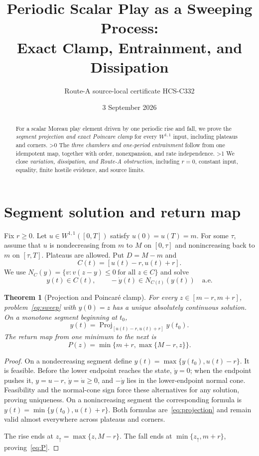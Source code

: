\documentclass[10pt]{article}
\title{Periodic Scalar Play as a Sweeping Process:\\Exact Clamp, Entrainment, and Dissipation}
\author{Route-A source-local certificate HCS-C332}
\date{3 September 2026}
\providecommand{\CRevisionRound}{2}
\newtheorem{theorem}{Theorem}
\newcommand{\Proj}{\operatorname{Proj}}
\begin{document}
\maketitle
\begin{abstract}
For a scalar Moreau play element driven by one periodic rise and fall, we
prove the \emph{segment projection and exact Poincare clamp} for every
$W^{1,1}$ input, including plateaus and corners.
\ifnum\CRevisionRound>0
The \emph{three chambers and one-period entrainment} follow from one
idempotent map, together with order, nonexpansion, and rate independence.
\fi
\ifnum\CRevisionRound>1
We close \emph{variation, dissipation, and Route-A obstruction}, including
$r=0$, constant input, equality, finite hostile evidence, and source limits.
\fi
\end{abstract}

\section{Segment solution and return map}
Fix $r\geq0$.  Let $u\in W^{1,1}([0,T])$ satisfy
$u(0)=u(T)=m$.  For some $\tau$, assume that $u$ is nondecreasing from
$m$ to $M$ on $[0,\tau]$ and nonincreasing back to $m$ on $[\tau,T]$.
Plateaus are allowed.  Put $D=M-m$ and
\[
 C(t)=[u(t)-r,u(t)+r].
\]
We use $N_C(y)=\{v:v(z-y)\leq0\ \text{for all }z\in C\}$ and solve
\begin{equation}\label{eq:sweep}
 y(t)\in C(t),\qquad-\dot y(t)\in N_{C(t)}(y(t))
 \quad\text{a.e.}
\end{equation}

\begin{theorem}[Projection and Poincar\'e clamp]\label{thm:clamp}
For every $z\in[m-r,m+r]$, problem~\eqref{eq:sweep} with $y(0)=z$ has a
unique absolutely continuous solution.  On a monotone segment beginning at
$t_0$,
\begin{equation}\label{eq:projection}
 y(t)=\Proj_{[u(t)-r,u(t)+r]}y(t_0).
\end{equation}
The return map from one minimum to the next is
\begin{equation}\label{eq:P}
 P(z)=\min\{m+r,\max\{M-r,z\}\}.
\end{equation}
\end{theorem}

\begin{proof}
On a nondecreasing segment define $y(t)=\max\{y(t_0),u(t)-r\}$.
It is feasible.  Before the lower endpoint reaches the state, $\dot y=0$;
when the endpoint pushes it, $y=u-r$, $\dot y=\dot u\geq0$, and
$-\dot y$ lies in the lower-endpoint normal cone.  Feasibility and the
normal-cone sign force these alternatives for any solution, proving
uniqueness.  On a nonincreasing segment the corresponding formula is
$y(t)=\min\{y(t_0),u(t)+r\}$.  Both formulas are~\eqref{eq:projection}
and remain valid almost everywhere across plateaus and corners.

The rise ends at $z_\uparrow=\max\{z,M-r\}$.  The fall ends at
$\min\{z_\uparrow,m+r\}$, proving~\eqref{eq:P}.
\end{proof}
\end{document}
